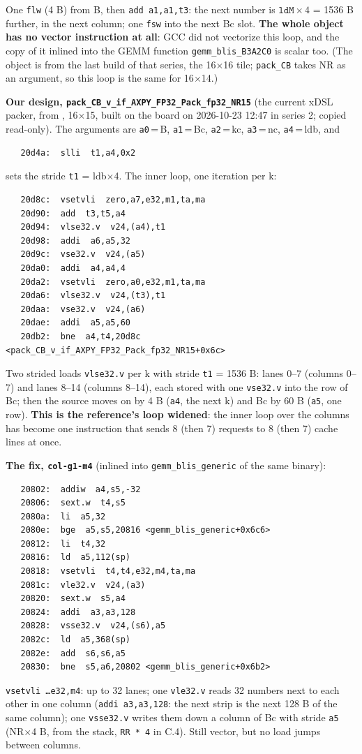 \documentclass[10pt,a4paper]{article}
\begin{document}
One \texttt{flw} (4 B) from B, then \texttt{add a1,a1,t3}: the next number is $\texttt{ldM}\times4$ = 1536 B further, in the next
column; one \texttt{fsw} into the next Bc slot. \textbf{The whole object has no vector instruction at all}: GCC did not vectorize this
loop, and the copy of it inlined into the GEMM function \texttt{gemm\_blis\_B3A2C0} is scalar too. (The object is from the last
build of that series, the 16$\times$16 tile; \texttt{pack\_CB} takes NR as an argument, so this loop is the same for 16$\times$14.)

\textbf{Our design, \texttt{pack\_CB\_v\_if\_AXPY\_FP32\_Pack\_fp32\_NR15}} (the current xDSL packer, from
, 16$\times$15, built on the board on 2026-10-23 12:47 in series 2; copied read-only).
The arguments are \texttt{a0}\,=\,B, \texttt{a1}\,=\,Bc, \texttt{a2}\,=\,kc, \texttt{a3}\,=\,nc, \texttt{a4}\,=\,ldb, and
{\footnotesize\begin{verbatim}
   20d4a:  slli  t1,a4,0x2
\end{verbatim}}
sets the stride \texttt{t1} = ldb$\times$4. The inner loop, one iteration per k:
{\footnotesize\begin{verbatim}
   20d8c:  vsetvli  zero,a7,e32,m1,ta,ma
   20d90:  add  t3,t5,a4
   20d94:  vlse32.v  v24,(a4),t1
   20d98:  addi  a6,a5,32
   20d9c:  vse32.v  v24,(a5)
   20da0:  addi  a4,a4,4
   20da2:  vsetvli  zero,a0,e32,m1,ta,ma
   20da6:  vlse32.v  v24,(t3),t1
   20daa:  vse32.v  v24,(a6)
   20dae:  addi  a5,a5,60
   20db2:  bne  a4,t4,20d8c <pack_CB_v_if_AXPY_FP32_Pack_fp32_NR15+0x6c>
\end{verbatim}}

Two strided loads \texttt{vlse32.v} per k with stride \texttt{t1} = 1536 B: lanes 0--7 (columns 0--7) and lanes 8--14 (columns
8--14), each stored with one \texttt{vse32.v} into the row of Bc; then the source moves on by 4 B (\texttt{a4}, the next k) and Bc by
60 B (\texttt{a5}, one row). \textbf{This is the reference's loop widened}: the inner loop over the columns has become one instruction
that sends 8 (then 7) requests to 8 (then 7) cache lines at once.

\textbf{The fix, \texttt{col-g1-m4}} (inlined into \texttt{gemm\_blis\_generic} of the same binary):
{\footnotesize\begin{verbatim}
   20802:  addiw  a4,s5,-32
   20806:  sext.w  t4,s5
   2080a:  li  a5,32
   2080e:  bge  a5,s5,20816 <gemm_blis_generic+0x6c6>
   20812:  li  t4,32
   20816:  ld  a5,112(sp)
   20818:  vsetvli  t4,t4,e32,m4,ta,ma
   2081c:  vle32.v  v24,(a3)
   20820:  sext.w  s5,a4
   20824:  addi  a3,a3,128
   20828:  vsse32.v  v24,(s6),a5
   2082c:  ld  a5,368(sp)
   2082e:  add  s6,s6,a5
   20830:  bne  s5,a6,20802 <gemm_blis_generic+0x6b2>
\end{verbatim}}

\texttt{vsetvli \dots e32,m4}: up to 32 lanes; one \texttt{vle32.v} reads 32 numbers next to each other in one column
(\texttt{addi a3,a3,128}: the next strip is the next 128 B of the same column); one \texttt{vsse32.v} writes them down a column of Bc
with stride \texttt{a5} (NR$\times$4 B, from the stack, \texttt{RR * 4} in C.4). Still vector, but no load jumps between columns.
\end{document}
